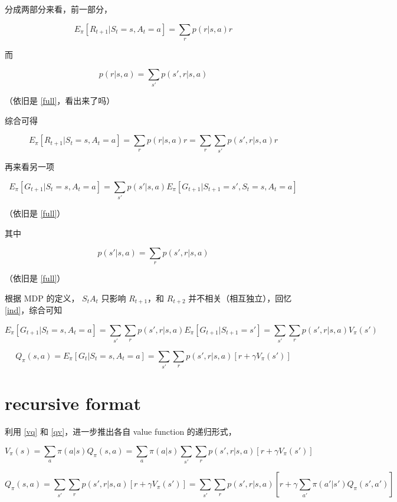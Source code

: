 \documentclass{article}
\begin{document}
分成两部分来看，前一部分，
 
 $$
 E_\pi[R_{t+1}| S_t = s, A_t = a] = \sum_r p(r | s, a) r
 $$
 
而
 
 $$
 p(r | s, a) = \sum_{s'} p(s', r | s, a)
 $$
 
（依旧是 \cref{full}，看出来了吗）
 
综合可得
 
 $$
 E_\pi[R_{t+1}| S_t = s, A_t = a] = \sum_r p(r | s, a) r = \sum_r \sum_{s'} p(s', r | s, a) r
 $$
 
再来看另一项
 
 $$
 E_\pi[G_{t+1}| S_t = s, A_t = a] = \sum_{s'} p(s' | s, a) E_\pi [G_{t+1} | S_{t+1} = s', S_t = s, A_t = a ]
 $$
 
（依旧是 \cref{full}）
 
其中
 
 $$
 p(s' | s, a) = \sum_r p(s', r | s, a)
 $$

（依旧是 \cref{full}）

根据 MDP 的定义， $S_t A_t$ 只影响 $R_{t+1}$，和 $R_{t+2}$ 并不相关（相互独立），回忆 \cref{ind}，综合可知
 
 $$
 E_\pi[G_{t+1}| S_t = s, A_t = a] = \sum_{s'} \sum_r p(s', r | s, a) E_\pi [G_{t+1} | S_{t+1} = s'] = \sum_{s'} \sum_r p(s', r | s, a) V_\pi(s')
 $$
 
 
 \begin{equation} \label{qv}
   Q_\pi(s, a) = E_\pi[G_t| S_t = s, A_t = a] = \sum_{s'} \sum_r p(s', r | s, a)[r + \gamma V_\pi(s')]
 \end{equation}

  
\section{recursive format}
 
利用 \cref{vq} 和 \cref{qv}，进一步推出各自 value function 的递归形式，

$$
 V_\pi(s) = \sum_a \pi(a|s) Q_\pi(s, a) = \sum_a \pi(a|s) \sum_{s'} \sum_r p(s', r | s, a)[r + \gamma V_\pi(s')]
$$
 
 
$$
   Q_\pi(s, a) = \sum_{s'} \sum_r p(s', r | s, a)[r + \gamma V_\pi(s')] = \sum_{s'} \sum_r p(s', r | s, a)[r + \gamma \sum_{a'} \pi(a'|s') Q_\pi(s', a')] 
$$
 
\end{document}

